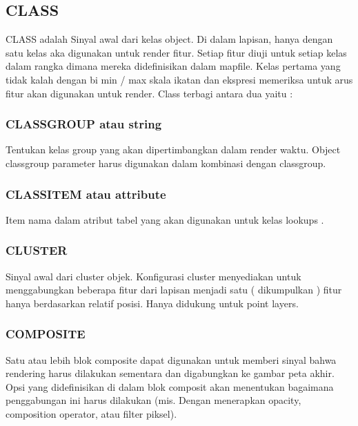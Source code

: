 \subsection{CLASS}
CLASS adalah Sinyal awal dari kelas object. Di dalam lapisan, hanya dengan satu kelas aka digunakan untuk render fitur.  
Setiap fitur diuji untuk setiap kelas dalam rangka dimana mereka didefinisikan dalam mapfile.  
Kelas pertama yang tidak kalah dengan bi min / max skala ikatan dan ekspresi memeriksa untuk arus fitur akan digunakan untuk render.  
Class terbagi antara dua yaitu :

  \subsubsection{CLASSGROUP atau string}
  Tentukan kelas group yang akan dipertimbangkan dalam render waktu. Object classgroup parameter harus digunakan dalam kombinasi dengan classgroup.
  \subsubsection{CLASSITEM atau attribute}
  Item nama dalam atribut tabel yang akan digunakan untuk kelas lookups .
  \subsubsection{CLUSTER}
  Sinyal awal dari cluster objek. Konfigurasi cluster menyediakan untuk menggabungkan beberapa fitur dari lapisan menjadi satu ( dikumpulkan ) fitur  hanya berdasarkan relatif posisi. Hanya didukung untuk point layers.
  \subsubsection{COMPOSITE}
  Satu atau lebih blok composite dapat digunakan untuk memberi sinyal bahwa rendering harus dilakukan sementara dan digabungkan ke gambar peta akhir. 
  Opsi yang didefinisikan di dalam blok composit akan menentukan bagaimana penggabungan ini harus dilakukan (mis. Dengan menerapkan opacity, composition operator, atau filter piksel).
  

